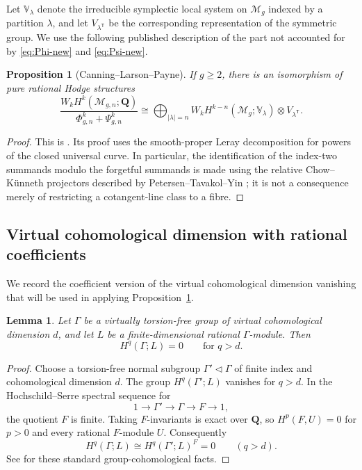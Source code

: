 \documentclass[12pt,reqno]{amsart}
\newcommand{\Q}{\mathbf{Q}}
\newcommand{\M}{\mathcal{M}}
\newtheorem{proposition}[theorem]{Proposition}
\newtheorem{lemma}[theorem]{Lemma}
\theoremstyle{definition}
\theoremstyle{remark}
\begin{document}
Let $\mathbb V_\lambda$ denote the irreducible symplectic local system on
$\M_g$ indexed by a partition $\lambda$, and let
$V_{\lambda^{\mathsf T}}$ be the corresponding representation of the
symmetric group.  We use the following published description of the part not
accounted for by \eqref{eq:Phi-new} and \eqref{eq:Psi-new}.

\begin{proposition}[Canning--Larson--Payne]\label{prop:primitive-new}
If $g\geq2$, there is an isomorphism of pure rational Hodge structures
\begin{equation}\label{eq:primitive-new}
 \frac{W_kH^k(\M_{g,n};\Q)}
      {\Phi^k_{g,n}+\Psi^k_{g,n}}
 \cong
 \bigoplus_{|\lambda|=n}
 W_kH^{k-n}(\M_g;\mathbb V_\lambda)
 \otimes V_{\lambda^{\mathsf T}}.
\end{equation}
\end{proposition}

\begin{proof}
This is \cite[Lemma~3.1(a)]{CLP}.  Its proof uses the smooth-proper Leray
decomposition for powers of the closed universal curve.  In particular, the
identification of the index-two summands modulo the forgetful summands is
made using the relative Chow--K\"unneth projectors described by
Petersen--Tavakol--Yin \cite[Sections~5.1 and 5.2.2]{PTY}; it is not a
consequence merely of restricting a cotangent-line class to a fibre.
\end{proof}

\subsection{Virtual cohomological dimension with rational coefficients}

We record the coefficient version of the virtual cohomological dimension
vanishing that will be used in applying
Proposition~\ref{prop:primitive-new}.

\begin{lemma}\label{lem:vcd-rational}
Let $\Gamma$ be a virtually torsion-free group of virtual cohomological
dimension $d$, and let $L$ be a finite-dimensional rational
$\Gamma$-module.  Then
\[
  H^q(\Gamma;L)=0\qquad\text{for }q>d.
\]
\end{lemma}

\begin{proof}
Choose a torsion-free normal subgroup $\Gamma'\triangleleft\Gamma$ of finite
index and cohomological dimension $d$.  The group
$H^q(\Gamma';L)$ vanishes for $q>d$.  In the Hochschild--Serre spectral
sequence for
\[
  1\longrightarrow\Gamma'\longrightarrow\Gamma
   \longrightarrow F\longrightarrow1,
\]
the quotient $F$ is finite.  Taking $F$-invariants is exact over $\Q$, so
$H^p(F,U)=0$ for $p>0$ and every rational $F$-module $U$.  Consequently
\[
  H^q(\Gamma;L)\cong H^q(\Gamma';L)^F=0
  \qquad(q>d).
\]
See \cite[Chapter~VII]{Brown} for these standard group-cohomological facts.
\end{proof}
\end{document}
